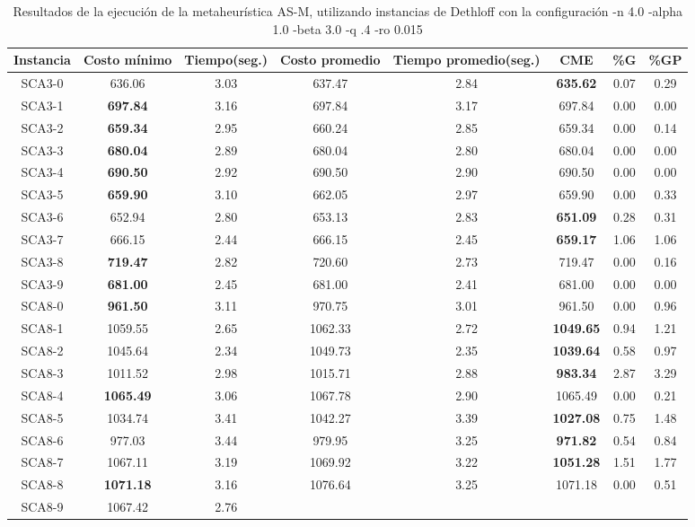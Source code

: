 \begin{table}[h]
\caption{Resultados de la ejecución de la metaheurística AS-M, utilizando instancias de Dethloff con la configuración -n 4.0 -alpha 1.0 -beta 3.0 -q .4 -ro 0.015}
\centering
\small
\begin{tabular}{c c c c c c c c}
\hline\hline
Instancia & Costo mínimo & Tiempo(seg.) & Costo promedio & Tiempo promedio(seg.) & CME & \%G & \%GP \\ [0.5ex]
\hline
SCA3-0 & 636.06 & 3.03 & 
637.47 & 2.84 & \bf{635.62} & 
0.07 & 0.29\\SCA3-1 & \bf{697.84} & 3.16 & 
697.84 & 3.17 & 697.84 & 0.00
 & 0.00\\
SCA3-2 & \bf{659.34} & 2.95 & 
660.24 & 2.85 & 659.34 & 0.00
 & 0.14\\SCA3-3 & \bf{680.04} & 2.89 & 
680.04 & 2.80 & 680.04 & 0.00
 & 0.00\\
SCA3-4 & \bf{690.50} & 2.92 & 
690.50 & 2.90 & 690.50 & 0.00
 & 0.00\\
SCA3-5 & \bf{659.90} & 3.10 & 
662.05 & 2.97 & 659.90 & 0.00
 & 0.33\\SCA3-6 & 652.94 & 2.80 & 
653.13 & 2.83 & \bf{651.09} & 
0.28 & 0.31\\SCA3-7 & 666.15 & 2.44 & 
666.15 & 2.45 & \bf{659.17} & 
1.06 & 1.06\\SCA3-8 & \bf{719.47} & 2.82 & 
720.60 & 2.73 & 719.47 & 0.00
 & 0.16\\SCA3-9 & \bf{681.00} & 2.45 & 
681.00 & 2.41 & 681.00 & 0.00
 & 0.00\\
SCA8-0 & \bf{961.50} & 3.11 & 
970.75 & 3.01 & 961.50 & 0.00
 & 0.96\\SCA8-1 & 1059.55 & 2.65 & 
1062.33 & 2.72 & \bf{1049.65} & 
0.94 & 1.21\\SCA8-2 & 1045.64 & 2.34 & 
1049.73 & 2.35 & \bf{1039.64} & 
0.58 & 0.97\\SCA8-3 & 1011.52 & 2.98 & 
1015.71 & 2.88 & \bf{983.34} & 
2.87 & 3.29\\SCA8-4 & \bf{1065.49} & 3.06 & 
1067.78 & 2.90 & 1065.49 & 0.00
 & 0.21\\SCA8-5 & 1034.74 & 3.41 & 
1042.27 & 3.39 & \bf{1027.08} & 
0.75 & 1.48\\SCA8-6 & 977.03 & 3.44 & 
979.95 & 3.25 & \bf{971.82} & 
0.54 & 0.84\\SCA8-7 & 1067.11 & 3.19 & 
1069.92 & 3.22 & \bf{1051.28} & 
1.51 & 1.77\\SCA8-8 & \bf{1071.18} & 3.16 & 
1076.64 & 3.25 & 1071.18 & 0.00
 & 0.51\\SCA8-9 & 1067.42 & 2.76 & 

\end{tabular}
\end{table}
